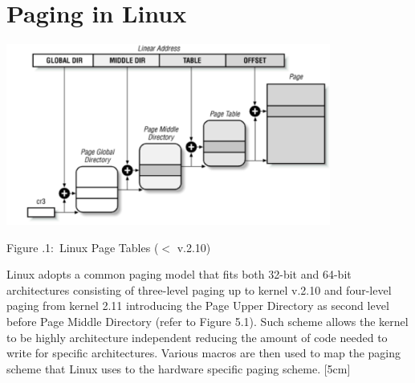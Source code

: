 \documentclass[twoside]{article}
\newcounter{lecnum}
\newcommand{\fig}[3]{
            \vspace{#2}
            \begin{center}
            Figure \thelecnum.#1:~#3
            \end{center}
    }
\begin{document}

\section{Paging in Linux}

\begin{center}
  \includegraphics[width=0.8\textwidth]{linuxvm.png}
  \fig{1}{0 pt}{Linux Page Tables ($<$ v.2.10)}
\end{center}

Linux adopts a common paging model that fits both 32-bit and 64-bit architectures consisting of three-level paging up to kernel v.2.10 and four-level paging from kernel 2.11 introducing the Page Upper Directory as second level before Page Middle Directory (refer to Figure 5.1). Such scheme allows the kernel to be highly architecture independent reducing the amount of code needed to write for specific architectures. Various macros are then used to map the paging scheme that Linux uses to the
hardware specific paging scheme. [5cm]
\end{document}
